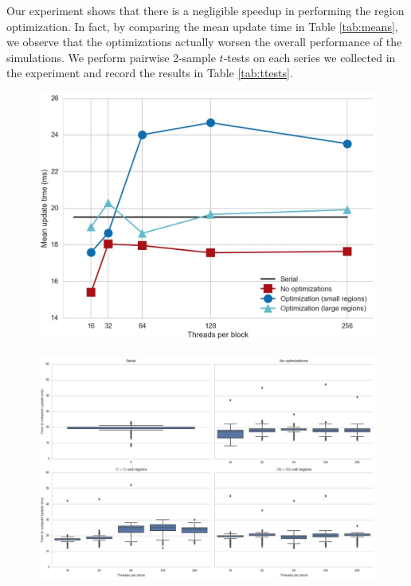 \documentclass[12pt]{article}
\begin{document}
    Our experiment shows that there is a negligible speedup in performing the
    region optimization. In fact, by comparing the mean update time in Table
    \ref{tab:means}, we observe that the optimizations actually worsen the
    overall performance of the simulations. We perform pairwise 2-sample
    $t$-tests on each series we collected in the experiment and record the
    results in Table \ref{tab:ttests}. 

    \begin{figure}[t]
        \centering
        \includegraphics[width=\textwidth]{../images/plot.jpg}
        \caption{}
        \label{fig:means}
    \end{figure}

    \begin{figure}[t]
        \centering
        \includegraphics[width=\textwidth]{../images/boxplot.jpg}
        \caption{}
        \label{fig:means}
    \end{figure}
\end{document}
